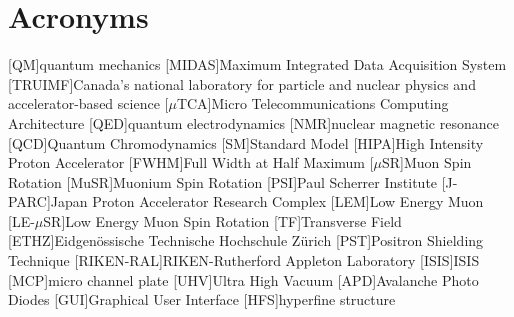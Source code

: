 \chapter{Acronyms}

\begin{acronym}[RIKEN-RAL] %
[QM]{quantum mechanics}
[MIDAS]{Maximum Integrated Data Acquisition System}
[TRUIMF]{Canada's national laboratory for particle and nuclear physics and accelerator-based science}
[$\mu$TCA]{Micro Telecommunications Computing Architecture}
[QED]{quantum electrodynamics}
[NMR]{nuclear magnetic resonance}
[QCD]{Quantum Chromodynamics}
[SM]{Standard Model}
[HIPA]{High Intensity Proton Accelerator}
[FWHM]{Full Width at Half Maximum}
[$\mu$SR]{Muon Spin Rotation}
[MuSR]{Muonium Spin Rotation}
[PSI]{Paul Scherrer Institute}
[J-PARC]{Japan Proton Accelerator Research Complex}
[LEM]{Low Energy Muon}
[LE-$\mu$SR]{Low Energy Muon Spin Rotation}
[TF]{Transverse Field}
[ETHZ]{Eidgenössische Technische Hochschule Z{\"u}rich}
[PST]{Positron Shielding Technique}
[RIKEN-RAL]{RIKEN-Rutherford Appleton Laboratory}
[ISIS]{ISIS}
[MCP]{micro channel plate}
[UHV]{Ultra High Vacuum}
[APD]{Avalanche Photo Diodes}
[GUI]{Graphical User Interface}
[HFS]{hyperfine structure}
\end{acronym}

%
%
%
